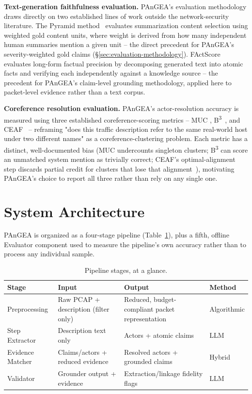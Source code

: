 \documentclass[sigconf,nonacm]{acmart}
\begin{document}
\textbf{Text-generation faithfulness evaluation.} PAnGEA's evaluation
methodology draws directly on two established lines of work outside the
network-security literature. The Pyramid method~\cite{nenkova2004pyramid}
evaluates summarization content selection using weighted gold content units,
where weight is derived from how many independent human summaries mention a
given unit -- the direct precedent for PAnGEA's severity-weighted gold claims
(\S\ref{sec:evaluation-methodology}). FActScore~\cite{min2023factscore}
evaluates long-form factual precision by decomposing generated text into atomic
facts and verifying each independently against a knowledge source -- the
precedent for PAnGEA's claim-level grounding methodology, applied here to
packet-level evidence rather than a text corpus.

\textbf{Coreference resolution evaluation.}
\label{sec:relwork:coref}
PAnGEA's actor-resolution accuracy
is measured using three established coreference-scoring metrics -- MUC
\cite{vilain1995muc}, B\textsuperscript{3}~\cite{bagga1998bcubed}, and
CEAF~\cite{luo2005ceaf} -- reframing "does this traffic description refer to
the same real-world host under two different names" as a coreference-clustering
problem. Each metric has a distinct, well-documented bias (MUC undercounts
singleton clusters; B\textsuperscript{3} can score an unmatched system mention
as trivially correct; CEAF's optimal-alignment step discards partial credit for
clusters that lose that alignment~\cite{cai2010twinless}), motivating PAnGEA's
choice to report all three rather than rely on any single one.

\section{System Architecture}
\label{sec:architecture}

PAnGEA is organized as a four-stage pipeline (Table~\ref{tab:stages}),
plus a fifth, offline Evaluator component used to measure the pipeline's
own accuracy rather than to process any individual sample.

\begin{table}[t]
\caption{Pipeline stages, at a glance.}
\label{tab:stages}
\begin{tabular}{p{2.6cm}p{3.6cm}p{3.6cm}p{2.2cm}}
\toprule
\textbf{Stage} & \textbf{Input} & \textbf{Output} & \textbf{Method} \\
\midrule
Preprocessing & Raw PCAP + description (filter only) & Reduced, budget-compliant packet representation & Algorithmic \\
Step Extractor & Description text only & Actors + atomic claims & LLM \\
Evidence Matcher & Claims/actors + reduced evidence & Resolved actors + grounded claims & Hybrid \\
Validator & Grounder output + evidence & Extraction/linkage fidelity flags & LLM \\
\bottomrule
\end{tabular}
\end{table}
\end{document}
